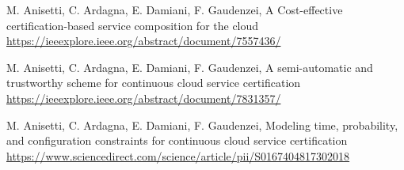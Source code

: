 \begin{thebibliography}{10}
  M. Anisetti, C. Ardagna, E. Damiani, F. Gaudenzei, A Cost-effective certification-based service composition for the cloud
  \url{https://ieeexplore.ieee.org/abstract/document/7557436/}

  M. Anisetti, C. Ardagna, E. Damiani, F. Gaudenzei, A semi-automatic and trustworthy scheme for continuous cloud service certification
  \url{https://ieeexplore.ieee.org/abstract/document/7831357/}

M. Anisetti, C. Ardagna, E. Damiani, F. Gaudenzei, Modeling time, probability, and configuration constraints for continuous cloud service certification
  \url{https://www.sciencedirect.com/science/article/pii/S0167404817302018}

\end{thebibliography}
